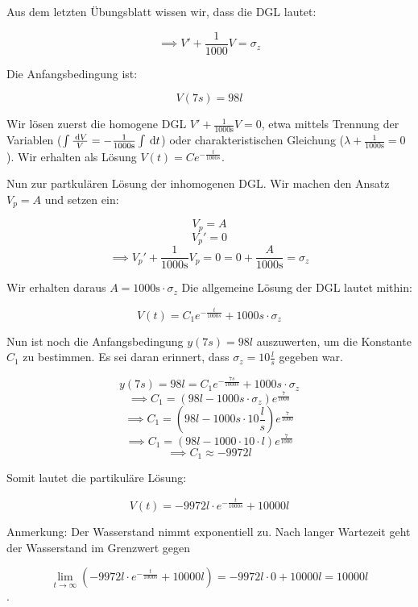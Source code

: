 \item

Aus dem letzten Übungsblatt wissen wir, dass die DGL lautet:

$$\implies V' + \frac{1}{1000} V = \sigma_z$$

Die Anfangsbedingung ist:

$$V(7s) = 98l$$

Wir lösen zuerst die homogene DGL $V'+\frac{1}{1000\text{s}}V = 0$, etwa mittels Trennung der Variablen ($\int\frac{\:\mathrm{d}{V}}{V}=-\frac{1}{1000\text{s}}\int\:\mathrm{d}{t}$) oder charakteristischen Gleichung ($\lambda + \frac{1}{1000\text{s}}=0$). Wir erhalten als Lösung $V(t) = C e^{-\frac{t}{1000s}}$. 

Nun zur partkulären Lösung der inhomogenen DGL. Wir machen den Ansatz $V_p=A$ und setzen ein:

$$ V_p = A $$
$$ V_p' = 0 $$
$$\implies V_p'+\frac{1}{1000\text{s}}V_p = 0 = 0 + \frac{A}{1000\text{s}} = \sigma_z$$

Wir erhalten daraus $A = 1000\text{s}\cdot \sigma_z$ Die allgemeine Lösung der DGL lautet mithin:

$$V(t) = C_1 e^{-\frac{t}{1000s}} + 1000s\cdot\sigma_z$$

Nun ist noch die Anfangsbedingung $y(7s) = 98l$ auszuwerten, um die Konstante $C_1$ zu bestimmen. Es sei daran erinnert, dass $\sigma_z = 10 \frac{l}{s}$ gegeben war.

$$y(7s) = 98l = C_1 e^{-\frac{7s}{1000s}} + 1000s\cdot\sigma_z$$
$$\implies C_1 = (98l - 1000s\cdot\sigma_z) e^{\frac{7}{1000}}$$
$$\implies C_1 = (98l - 1000s\cdot 10 \frac{l}{s}) e^{\frac{7}{1000}}$$
$$\implies C_1 = (98l - 1000 \cdot 10 \cdot l) e^{\frac{7}{1000}}$$
$$\implies C_1 \approx -9972l$$

Somit lautet die partikuläre Lösung:

$$V(t) = -9972l \cdot e^{-\frac{t}{1000s}} + 10000l $$

Anmerkung: Der Wasserstand nimmt exponentiell zu. Nach langer Wartezeit geht der Wasserstand im Grenzwert gegen

$$\lim\limits_{t\to\infty}\left(-9972l \cdot e^{-\frac{t}{1000s}} + 10000l\right) = -9972l\cdot 0 + 10000l = 10000l$$.


